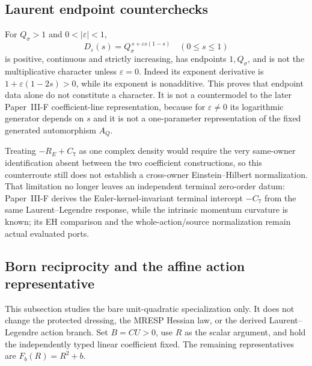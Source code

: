 \documentclass[11pt,a4paper]{article}
\begin{document}
\subsection{Laurent endpoint counterchecks}
\label{p3e:app:laurent-endpoint-counterchecks}
For \(Q_\sigma>1\) and \(0<|\varepsilon|<1\),
\[
 D_\varepsilon(s)=Q_\sigma^{\,s+\varepsilon s(1-s)}
 \quad(0\leq s\leq1)
\]
is positive, continuous and strictly increasing, has endpoints
\(1,Q_\sigma\), and is not the multiplicative character unless
\(\varepsilon=0\).  Indeed its exponent derivative is
\(1+\varepsilon(1-2s)>0\), while its exponent is nonadditive.
This proves that endpoint data alone do not constitute a character.  It is not a countermodel to the later Paper~III-F coefficient-line representation, because for \(\varepsilon\ne0\) its logarithmic generator depends on \(s\) and it is not a one-parameter representation of the fixed generated automorphism \(A_Q\).

Treating \(-R_E+C_7\) as one complex density would require the very
same-owner identification absent between the two coefficient constructions,
so this counterroute still does not establish a cross-owner Einstein--Hilbert
normalization.  That limitation no longer leaves an independent terminal
zero-order datum: Paper~III-F derives the Euler-kernel-invariant terminal
intercept \(-C_7\) from the same Laurent--Legendre response, while the
intrinsic momentum curvature is known; its EH comparison and the
whole-action/source normalization remain actual evaluated ports.


\subsection{Born reciprocity and the affine action representative}
\label{p3e:app:born-affine-audit}
This subsection studies the bare unit-quadratic specialization only. It does
not change the protected dressing, the MRESP Hessian law, or the derived
Laurent--Legendre action branch. Set \(B=CU>0\), use \(R\) as the
scalar argument, and hold the independently typed linear coefficient fixed.
The remaining representatives are \(F_b(R)=R^2+b\).
\end{document}
